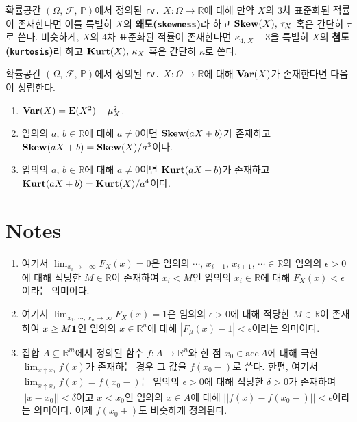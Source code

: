 \begin{definition}
    확률공간 $(\Omega,\,\mathcal{F},\,\mathbb{P})$에서 정의된 \texttt{rv.} $X:\Omega\to\mathbb{R}$에 대해 만약 $X$의 3차 표준화된 적률이 존재한다면 이를 특별히 $X$의 \textbf{왜도(\texttt{skewness})}라 하고 $\mathbf{Skew}(X),\,\tau_X$ 혹은 간단히 $\tau$로 쓴다. 비슷하게, $X$의 4차 표준화된 적률이 존재한다면 $\kappa_{4,\,X}-3$을 특별히 $X$의 \textbf{첨도(\texttt{kurtosis})}라 하고 $\mathbf{Kurt}(X),\,\kappa_X$ 혹은 간단히 $\kappa$로 쓴다.
\end{definition}

\begin{theorem}
    확률공간 $(\Omega,\,\mathcal{F},\,\mathbb{P})$에서 정의된 \texttt{rv.} $X:\Omega\to\mathbb{R}$에 대해 $\mathbf{Var}(X)$가 존재한다면 다음이 성립한다.
    \begin{enumerate}
        \item $\mathbf{Var}(X)=\mathbf{E}(X^2)-\mu_X^2$.
        \item 임의의 $a,\,b\in\mathbb{R}$에 대해 $a\ne0$이면 $\mathbf{Skew}(aX+b)$가 존재하고 $\mathbf{Skew}(aX+b)=\mathbf{Skew}(X)/a^3$이다.
        \item 임의의 $a,\,b\in\mathbb{R}$에 대해 $a\ne0$이면 $\mathbf{Kurt}(aX+b)$가 존재하고 $\mathbf{Kurt}(aX+b)=\mathbf{Kurt}(X)/a^4$이다.
    \end{enumerate}
\end{theorem}

\section*{Notes}
\footnotesize
\begin{enumerate}[label = \textsf{\textbf{\arabic*}}]
    \item 여기서 $\lim_{x_i\to-\infty}F_X(x)=0$은 임의의 $\cdots,\,x_{i-1},\,x_{i+1},\,\cdots\in\mathbb{R}$와 임의의 $\epsilon>0$에 대해 적당한 $M\in\mathbb{R}$이 존재하여 $x_i<M$인 임의의 $x_i\in\mathbb{R}$에 대해 $F_X(x)<\epsilon$이라는 의미이다.
    \item 여기서 $\lim_{x_1,\,\cdots,\,x_n\to\infty}F_X(x)=1$은 임의의 $\epsilon>0$에 대해 적당한 $M\in\mathbb{R}$이 존재하여 $x\geq M\mathbf{1}$인 임의의 $x\in\mathbb{R}^n$에 대해 $|F_\mu(x)-1|<\epsilon$이라는 의미이다.
    \item 집합 $A\subseteq\mathbb{R}^m$에서 정의된 함수 $f:A\to\mathbb{R}^n$와 한 점 $x_0\in\mathrm{acc}\,A$에 대해 극한 $\lim_{x\uparrow x_0}f(x)$가 존재하는 경우 그 값을 $f(x_0-)$로 쓴다. 한편, 여기서 $\lim_{x\uparrow x_0}f(x)=f(x_0-)$는 임의의 $\epsilon>0$에 대해 적당한 $\delta>0$가 존재하여 $||x-x_0||<\delta$이고 $x<x_0$인 임의의 $x\in A$에 대해 $||f(x)-f(x_0-)||<\epsilon$이라는 의미이다. 이제 $f(x_0+)$도 비슷하게 정의된다.
\end{enumerate}
